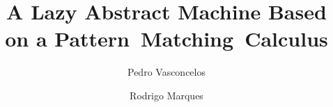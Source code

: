 \documentclass[sigconf]{acmart}
\author{Pedro Vasconcelos}
\affiliation{LIACC and DCC/FCUP}
\author{Rodrigo Marques}
\affiliation{LIACC}
\begin{document}
\title{A Lazy Abstract Machine Based on a Pattern~Matching~Calculus}

\maketitle











 
\end{document}
